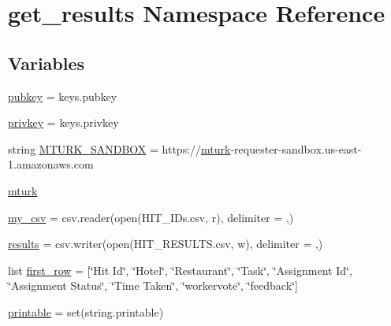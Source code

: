 \hypertarget{namespaceget__results}{}\section{get\+\_\+results Namespace Reference}
\label{namespaceget__results}
\subsection*{Variables}
\begin{DoxyCompactItemize}
\item 
\mbox{\hyperlink{namespaceget__results_a472244c9add0e4115ce313312dde7224}{pubkey}} = keys.\+pubkey
\item 
\mbox{\hyperlink{namespaceget__results_ae5335a2167ab5606ba0586b71c1bbf8c}{privkey}} = keys.\+privkey
\item 
string \mbox{\hyperlink{namespaceget__results_ae62b2c698fe34f48fcc67433b6495a00}{M\+T\+U\+R\+K\+\_\+\+S\+A\+N\+D\+B\+OX}} = \textquotesingle{}https\+://\mbox{\hyperlink{namespaceget__results_a5d236ec2d0fb7be80dec953c4f7564d7}{mturk}}-\/requester-\/sandbox.\+us-\/east-\/1.amazonaws.\+com\textquotesingle{}
\item 
\mbox{\hyperlink{namespaceget__results_a5d236ec2d0fb7be80dec953c4f7564d7}{mturk}}
\item 
\mbox{\hyperlink{namespaceget__results_ab133ba8828d2f08f3cdd4fe1ba35eb28}{my\+\_\+csv}} = csv.\+reader(open(\textquotesingle{}H\+I\+T\+\_\+\+I\+Ds.\+csv\textquotesingle{}, \textquotesingle{}r\textquotesingle{}), delimiter = \textquotesingle{},\textquotesingle{})
\item 
\mbox{\hyperlink{namespaceget__results_a339bb5524b06e496a6aaa0a97a4a8d21}{results}} = csv.\+writer(open(\textquotesingle{}H\+I\+T\+\_\+\+R\+E\+S\+U\+L\+T\+S.\+csv\textquotesingle{}, \textquotesingle{}w\textquotesingle{}), delimiter = \textquotesingle{},\textquotesingle{})
\item 
list \mbox{\hyperlink{namespaceget__results_a2066d73776773d67d4f57e76c74457ec}{first\+\_\+row}} = \mbox{[}\char`\"{}Hit Id\char`\"{}, \char`\"{}Hotel\char`\"{}, \char`\"{}Restaurant\char`\"{}, \char`\"{}Task\char`\"{}, \char`\"{}Assignment Id\char`\"{}, \char`\"{}Assignment Status\char`\"{}, \char`\"{}Time Taken\char`\"{}, \char`\"{}workervote\char`\"{}, \char`\"{}feedback\char`\"{}\mbox{]}
\item 
\mbox{\hyperlink{namespaceget__results_a755cb7c1ef593735d8d3d0ab5a281b67}{printable}} = set(string.\+printable)
\item 

\end{DoxyCompactItemize}
